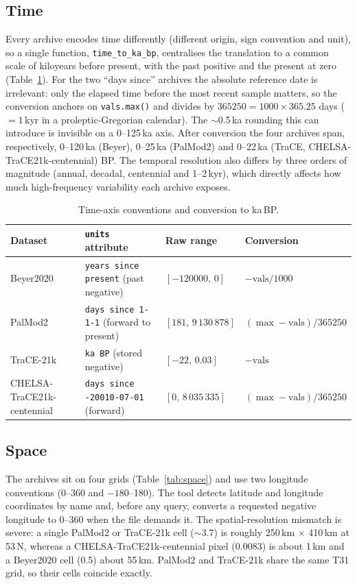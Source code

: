 \documentclass{isprs} %
\newcommand{\dg}{\textdegree}
\newcommand{\tabbr}[1]{\texttt{#1}}
\newcommand{\kaBP}{ka\,BP}
\begin{document}
\subsection{Time}
Every archive encodes time differently (different origin, sign convention and unit), so a single function, \tabbr{time\_to\_ka\_bp}, centralises the translation to a common scale of kiloyears before present, with the past positive and the present at zero (Table~\ref{tab:time}). For the two ``days since'' archives the absolute reference date is irrelevant: only the elapsed time before the most recent sample matters, so the conversion anchors on \tabbr{vals.max()} and divides by $365250 = 1000\times365.25$ days ($=1$\,kyr in a proleptic-Gregorian calendar). The $\sim$0.5\,ka rounding this can introduce is invisible on a 0--125\,ka axis. After conversion the four archives span, respectively, 0--120\,ka (Beyer), 0--25\,ka (PalMod2) and 0--22\,ka (TraCE, CHELSA-TraCE21k-centennial) BP. The temporal resolution also differs by three orders of magnitude (annual, decadal, centennial and 1--2\,kyr), which directly affects how much high-frequency variability each archive exposes.

\begin{table}[t]
\centering
\small
\begin{tabular}{llll}
\toprule
Dataset   & \tabbr{units} attribute                       & Raw range             & Conversion \\
\midrule
Beyer2020 & \tabbr{years since present} (past negative)   & $[-120000,\,0]$       & $-\mathrm{vals}/1000$ \\
PalMod2   & \tabbr{days since 1-1-1} (forward to present) & $[181,\,9\,130\,878]$ & $(\max-\mathrm{vals})/365250$ \\
TraCE-21k & \tabbr{ka BP} (stored negative)               & $[-22,\,0.03]$        & $-\mathrm{vals}$ \\
CHELSA-TraCE21k-centennial    & \tabbr{days since -20010-07-01} (forward)     & $[0,\,8\,035\,335]$   & $(\max-\mathrm{vals})/365250$ \\
\bottomrule
\end{tabular}
\caption{Time-axis conventions and conversion to \kaBP.}
\label{tab:time}
\end{table}

\subsection{Space}
The archives sit on four grids (Table~\ref{tab:space}) and use two longitude conventions (0--360\dg{} and $-180$--180\dg). The tool detects latitude and longitude coordinates by name and, before any query, converts a requested negative longitude to 0--360\dg{} when the file demands it. The spatial-resolution mismatch is severe: a single PalMod2 or TraCE-21k cell ($\sim$3.7\dg) is roughly 250\,km $\times$ 410\,km at 53\dg\,N, whereas a CHELSA-TraCE21k-centennial pixel (0.0083\dg) is about 1\,km and a Beyer2020 cell (0.5\dg) about 55\,km. PalMod2 and TraCE-21k share the same T31 grid, so their cells coincide exactly.
\end{document}
